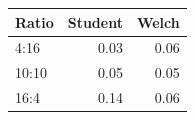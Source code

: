 
\begin{tabular}{lrr}
\toprule
Ratio & Student & Welch\\
\midrule
4:16 & 0.03 & 0.06\\
10:10 & 0.05 & 0.05\\
16:4 & 0.14 & 0.06\\
\bottomrule
\end{tabular}

